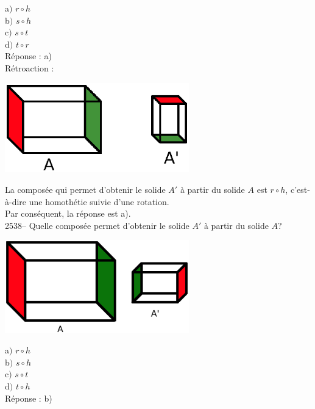 \documentclass[letterpaper, 12pt]{article}
\begin{document}
a$)$ $r\circ h$\\
b$)$ $s\circ h$\\
c$)$ $s\circ t$\\
d$)$ $t\circ r$\\

R\'eponse : a)\\

R\'etroaction :\\
\begin{center}
 \includegraphics[width=8cm,bb=14 14 359 180]{Q2537.eps}
\end{center}
La compos\'ee qui permet d'obtenir le solide $A'$ \`a partir du solide $A$ est $r\circ h$, c'est-\`a-dire une homoth\'etie suivie d'une rotation. \\
Par cons\'equent, la r\'eponse est a).\\

2538-- Quelle compos\'ee permet d'obtenir le solide $A'$ \`a partir du solide $A$?\\
\begin{center}
 \includegraphics[width=8cm,bb=14 14 517 296]{Q2538.eps}
\end{center}

a$)$ $r\circ h$\\
b$)$ $s\circ h$\\
c$)$ $s\circ t$\\
d$)$ $t\circ h$\\

R\'eponse : b)\\
\end{document}
